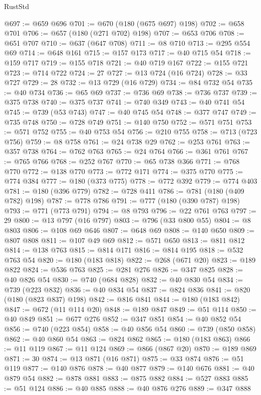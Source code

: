 \begin{lexlean}{RustStd}
\begin{coremodule}
{\begin{coremodule}
{{{{{{{{{{{{{{{{{{{{{{{{{{{{{{{{{{{@697 := @659 @696
@701 := @670 (@180 (@675 @697) @198)
@702 := @658 @701
@706 := @657 (@180 (@271 @702) @198)
@707 := @653 @706
@708 := @651 @707
@710 := @637 (@647 @708)
@711 := @8 @710
@713 := @295 @554 @69
@714 := @648 @161
@715 := @157 @173
@717 := @40 @715 @54
@718 := @159 @717
@719 := @155 @718
@721 := @40 @719 @167
@722 := @155 @721
@723 := @714 @722
@724 := 27
@727 := @13 @724 (@16 @724)
@728 := @33 @727
@729 := 28
@732 := @13 @729 (@16 @729)
@734 := @84 @732 @54
@735 := @40 @734
@736 := @65 @69
@737 := @736 @69
@738 := @736 @737
@739 := @375 @738
@740 := @375 @737
@741 := @740 @349
@743 := @40 @741 @54
@745 := @739 (@53 @743)
@747 := @40 @745 @54
@748 := @377 @747
@749 := @735 @748
@750 := @728 @749
@751 := @140 @750
@752 := @571 @751
@753 := @571 @752
@755 := @40 @753 @54
@756 := @210 @755
@758 := @713 (@723 @756)
@759 := @8 @758
@761 := @24 @738 @29
@762 := @253 @761
@763 := @357 @738
@764 := @762 @763
@765 := @24 @764
@766 := @361 @761
@767 := @765 @766
@768 := @252 @767
@770 := @65 @738 @366
@771 := @768 @770
@772 := @138 @770
@773 := @772 @171
@774 := @375 @770
@775 := @774 @384
@777 := @180 (@373 @775)
@778 := @772 @392
@779 := @774 @403
@781 := @180 (@396 @779)
@782 := @728 @411
@786 := @781 (@180 (@409 @782) @198)
@787 := @778 @786
@791 := @777 (@180 (@390 @787) @198)
@793 := @771 (@773 @791)
@794 := @8 @793
@796 := @22 @761 @763
@797 := 29
@800 := @13 @797 (@16 @797)
@803 := @796 (@33 @800 @55)
@804 := @8 @803
@806 := @108 @69 @646
@807 := @648 @69
@808 := @140 @650
@809 := @807 @808
@811 := @107 @49 @69
@812 := @571 @650
@813 := @811 @812
@814 := @138 @763
@815 := @814 @171
@816 := @814 @195
@818 := @532 @763 @54
@820 := @180 (@183 @818)
@822 := @268 (@671 @20)
@823 := @189 @822
@824 := @536 @763
@825 := @281 @276
@826 := @347 @825
@828 := @40 @826 @54
@830 := @740 (@684 @828)
@832 := @40 @830 @54
@834 := @739 (@223 @832)
@836 := @40 @834 @54
@837 := @824 @836
@841 := @820 (@180 (@823 @837) @198)
@842 := @816 @841
@844 := @180 (@183 @842)
@847 := @672 (@11 @114 @20)
@848 := @189 @847
@849 := @51 @114
@850 := @40 @849
@851 := @677 @276
@852 := @347 @851
@854 := @40 @852 @54
@856 := @740 (@223 @854)
@858 := @40 @856 @54
@860 := @739 (@850 @858)
@862 := @40 @860 @54
@863 := @824 @862
@865 := @180 (@183 @863)
@866 := @11 @119
@867 := @11 @124
@869 := @866 (@867 @20)
@870 := @189 @869
@871 := 30
@874 := @13 @871 (@16 @871)
@875 := @33 @874
@876 := @51 @119
@877 := @140 @876
@878 := @40 @877
@879 := @140 @676
@881 := @40 @879 @54
@882 := @878 @881
@883 := @875 @882
@884 := @527 @883
@885 := @51 @124
@886 := @40 @885
@888 := @40 @876 @276
@889 := @347 @888
}}}}}}}}}}}}}}}}}}}}}}}}}}}}}}}}}}}
\end{coremodule}}
\end{coremodule}
\end{lexlean}
